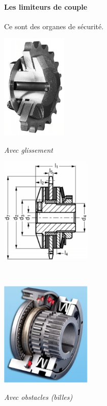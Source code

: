 \documentclass[11pt,oneside]{article}
\begin{document}
\paragraph{Les limiteurs de couple}
Ce sont des organes de sécurité.

\begin{minipage}[c]{.3\linewidth}
\begin{center}
\includegraphics[height=5cm]{png/fig_30}

\textit{Avec glissement}
\end{center}
\end{minipage} \hfill
\begin{minipage}[c]{.3\linewidth}
\begin{center}
\includegraphics[height=5cm]{png/fig_31}

\textit{$\quad$}
\end{center}
\end{minipage}\hfill
\begin{minipage}[c]{.3\linewidth}
\begin{center}
\includegraphics[height=5cm]{png/fig_32}

\textit{Avec obstacles (billes) }
\end{center}
\end{minipage}
\end{document}
